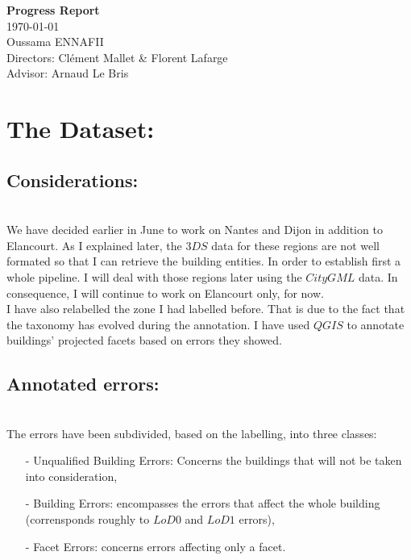 \documentclass[a4paper, 11pt]{article}
\begin{document}
	\begin{centering}
		\Large{\textbf{Progress Report}}\\
		\large{\today}
~\\
		Oussama ENNAFII\\
		Directors: Cl\'ement Mallet \& Florent Lafarge \\
		Advisor: Arnaud Le Bris \\

	\end{centering}


	\section{The Dataset:}
	\subsection{Considerations:}
~\\

	We have decided earlier in June to work on Nantes and Dijon in addition to
	Elancourt. As I explained later, the $3DS$ data for these regions are not
	well formated so that I can retrieve the building entities. In order to
	establish first a whole pipeline. I will deal with those regions later using
	the $CityGML$ data. In consequence, I will continue to work on Elancourt
	only, for now.\\

	I have also relabelled the zone I had labelled before. That is due to the fact
	that the taxonomy has evolved during the annotation. I have used $QGIS$ to
	annotate buildings' projected facets based on errors they showed.\\

	\subsection{Annotated errors:}
~\\


	The errors have been subdivided, based on the labelling, into three classes:

	\begin{itemize}
		\item[-] Unqualified Building Errors: Concerns the buildings that will not
		be taken into consideration,
		\item[-] Building Errors: encompasses the errors that affect the whole
		building (corrensponds roughly to $LoD0$ and $LoD1$ errors),
		\item[-] Facet Errors: concerns errors affecting only a facet.
	\end{itemize}
\end{document}
